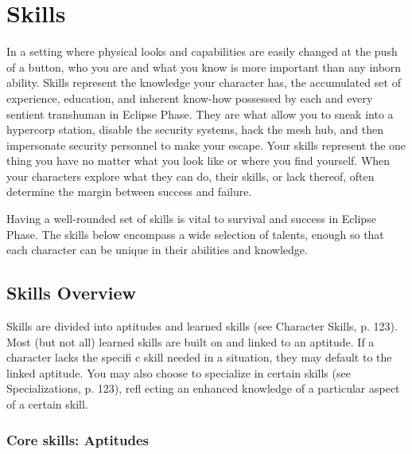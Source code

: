 \chapter{Skills}
\label{cha:skills}

In a setting where physical looks and capabilities are easily changed at the push of a button, who you are and what you know is more important than any inborn ability. Skills represent the knowledge your character has, the accumulated set of experience, education, and inherent know-how possessed by each and every sentient transhuman in Eclipse Phase. They are what allow you to sneak into a hypercorp station, disable the security systems, hack the mesh hub, and then impersonate security personnel to make your escape. Your skills represent the one thing you have no matter what you look like or where you find yourself. When your characters explore what they can do, their skills, or lack thereof, often determine the margin between success and failure.

Having a well-rounded set of skills is vital to survival and success in Eclipse Phase. The skills below encompass a wide selection of talents, enough so that each character can be unique in their abilities and knowledge.


\section{Skills Overview}
\label{sec:skills-overview}

Skills are divided into aptitudes and learned skills (see Character Skills, p. 123). Most (but not all) learned skills are built on and linked to an aptitude. If a character lacks the specifi c skill needed in a situation, they may default to the linked aptitude. You may also
choose to specialize in certain skills (see Specializations, p. 123), refl ecting an enhanced knowledge of a particular aspect of a certain skill.


\subsection{Core skills: Aptitudes}
\label{sec:core-skills-aptitudes}

